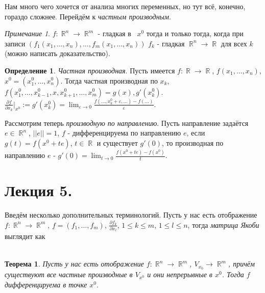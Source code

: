 \documentclass[a4paper,100pt]{article}
\theoremstyle{indented}
\newtheorem{theorem}{Теорема}
\theoremstyle{definition}
\newtheorem{defn}{Определение}
\theoremstyle{remark}
\newtheorem{remark}{Примечание}
\DeclareMathOperator{\RR}{\mathbb{R}}
\begin{document}
Нам много чего хочется от анализа многих переменных, но тут всё, конечно, гораздо сложнее. Перейдём к \textit{частным производным}.

\begin{remark}
    $f:\RR^n\rightarrow \RR^m$ - гладкая в  $x^0$ тогда и только тогда, когда  при записи $(f_1(x_1, \ldots, x_n), \ldots, f_m(x_1, \ldots, x_n))$ $f_k$ - гладкая $\RR^n\rightarrow \RR$ для всех $k$ (можно написать доказательство). 
\end{remark}  

\begin{defn}
    \textit{Частная производная}. Пусть имеется $f:\RR\rightarrow \RR$, $f(x_1, \ldots, x_n)$, $x^0=(x_1^0, \ldots, x_n^0)$. Тогда частная производная по $x_k $, $f(x_1^0, \ldots, x_{k-1}^0, x, x_{k+1}^0, \ldots, x_m^0)=g(x), g'(x_k^0)$. $\frac{\partial f}{\partial x_k}\bigg|_{x^0}:=g'(x_k^0)=\lim_{\varepsilon\rightarrow 0}\frac{f(\ldots, x_k^0+\varepsilon, \ldots)-f(\ldots)}{\varepsilon}$. 
\end{defn}

Рассмотрим теперь \textit{производную по направлению}. Пусть направление задаётся $e\in\RR^n$, $||e||=1$, $f$ - дифференцируема по направлению $e$, если $g(t)=f(x^0+te)$, $t\in\RR$ и существует $g'(0)$, то производная по направлению $e$ - $g'(0)=\lim_{t\rightarrow 0}\frac{f(x^0+te)-f(x^0)}{t}$.  

\section{Лекция 5.}

Введём несколько дополнительных терминологий. Пусть у нас есть отображение $f:\RR^n\rightarrow \RR^m$, $f=(f_1, \ldots, f_m)$, $\frac{\partial f_k}{\partial x_l}$, $1\leq k\leq m$, $1\leq l\leq n$, тогда \textit{матрица Якоби} выглядит как

\begin{equation*}
    \begin{matrix}
    \end{matrix}
\end{equation*}

\begin{theorem}
    Пусть у нас есть отображение $f:\RR^n\rightarrow \RR^m$, $V_{x_0}\rightarrow \RR^m$, причём существуют все частные производные в $V_{x^0}$ и они непрерывные в $x^0$. Тогда $f$ дифференцируема в точке $x^0$. 
\end{theorem}
\end{document}
